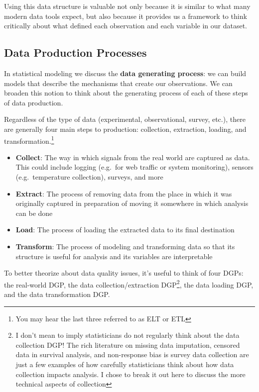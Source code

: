 \documentclass[
]{krantz}
\providecommand{\tightlist}{%
  \setlength{\itemsep}{0pt}\setlength{\parskip}{0pt}}
\begin{document}
Using this data structure is valuable not only because it is similar to what many modern data tools expect, but also because it provides us a framework to think critically about what defined each observation and each variable in our dataset.

\hypertarget{data-production-processes}{%
\subsection{Data Production Processes}\label{data-production-processes}}

In statistical modeling we discuss the \textbf{data generating process}: we can build models that describe the mechanisms that create our observations.
We can broaden this notion to think about the generating process of each of these steps of data production.

Regardless of the type of data (experimental, observational, survey, etc.), there are generally four main steps to production: collection, extraction, loading, and transformation.\footnote{You may hear the last three referred to as ELT or ETL}

\begin{itemize}
\tightlist
\item
  \textbf{Collect}: The way in which signals from the real world are captured as data. This could include logging (e.g.~for web traffic or system monitoring), sensors (e.g.~temperature collection), surveys, and more
\item
  \textbf{Extract}: The process of removing data from the place in which it was originally captured in preparation of moving it somewhere in which analysis can be done
\item
  \textbf{Load}: The process of loading the extracted data to its final destination
\item
  \textbf{Transform}: The process of modeling and transforming data so that its structure is useful for analysis and its variables are interpretable
\end{itemize}

To better theorize about data quality issues, it's useful to think of four DGPs: the real-world DGP, the data collection/extraction DGP\footnote{I don't mean to imply statisticians do not regularly think about the data collection DGP! The rich literature on missing data imputation, censored data in survival analysis, and non-response bias is survey data collection are just a few examples of how carefully statisticians think about how data collection impacts analysis. I chose to break it out here to discuss the more technical aspects of collection}, the data loading DGP, and the data transformation DGP.
\end{document}
